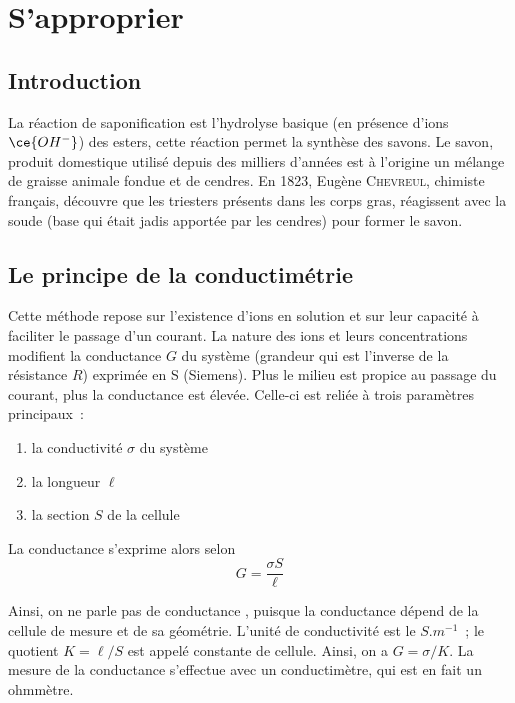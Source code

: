 \documentclass[../main/main.tex]{subfiles}
\begin{document}
\section{S'approprier}
\subsection{Introduction}

La réaction de saponification est l'hydrolyse basique (en présence d'ions
$\ce{OH^-}$) des esters, cette réaction permet la synthèse des savons. Le savon,
produit domestique utilisé depuis des milliers d'années est à l'origine un
mélange de graisse animale fondue et de cendres. En 1823, Eugène
\textsc{Chevreul}, chimiste français, découvre que les triesters présents dans
les corps gras, réagissent avec la soude (base qui était jadis apportée par les
cendres) pour former le savon.

\subsection{Le principe de la conductimétrie}

Cette méthode repose sur l'existence d'ions en solution et sur leur capacité à
faciliter le passage d'un courant. La nature des ions et leurs concentrations
modifient la conductance $G$ du système (grandeur qui est l'inverse de la
résistance $R$) exprimée en \si{S} (Siemens). Plus le milieu est propice au
passage du courant, plus la conductance est élevée. Celle-ci est reliée à trois
paramètres principaux~:

\begin{enumerate}
	\item la conductivité $\sigma$ du système
	\item la longueur $\ell$
	\item la section $S$ de la cellule
\end{enumerate}

La conductance s'exprime alors selon
\[G = \frac{\sigma S}{\ell}\]

Ainsi, on ne parle pas de conductance , puisque la
conductance dépend de la cellule de mesure et de sa géométrie. L'unité de
conductivité est le $\si{S.m^{-1}}$~; le quotient $K = \ell / S$ est appelé
constante de cellule. Ainsi, on a $G = \sigma / K$. La mesure de la conductance
s'effectue avec un conductimètre, qui est en fait un ohmmètre.\bigbreak
\end{document}
